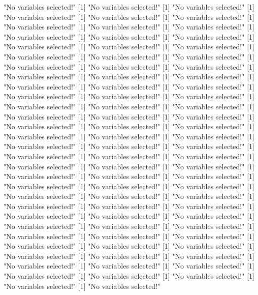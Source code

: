 \documentclass{amsart}
\begin{document}
\begin{Schunk}
\begin{Soutput}
[1] "No variables selected!"
[1] "No variables selected!"
[1] "No variables selected!"
[1] "No variables selected!"
[1] "No variables selected!"
[1] "No variables selected!"
[1] "No variables selected!"
[1] "No variables selected!"
[1] "No variables selected!"
[1] "No variables selected!"
[1] "No variables selected!"
[1] "No variables selected!"
[1] "No variables selected!"
[1] "No variables selected!"
[1] "No variables selected!"
[1] "No variables selected!"
[1] "No variables selected!"
[1] "No variables selected!"
[1] "No variables selected!"
[1] "No variables selected!"
[1] "No variables selected!"
[1] "No variables selected!"
[1] "No variables selected!"
[1] "No variables selected!"
[1] "No variables selected!"
[1] "No variables selected!"
[1] "No variables selected!"
[1] "No variables selected!"
[1] "No variables selected!"
[1] "No variables selected!"
[1] "No variables selected!"
[1] "No variables selected!"
[1] "No variables selected!"
[1] "No variables selected!"
[1] "No variables selected!"
[1] "No variables selected!"
[1] "No variables selected!"
[1] "No variables selected!"
[1] "No variables selected!"
[1] "No variables selected!"
[1] "No variables selected!"
[1] "No variables selected!"
[1] "No variables selected!"
[1] "No variables selected!"
[1] "No variables selected!"
[1] "No variables selected!"
[1] "No variables selected!"
[1] "No variables selected!"
[1] "No variables selected!"
[1] "No variables selected!"
[1] "No variables selected!"
[1] "No variables selected!"
[1] "No variables selected!"
[1] "No variables selected!"
[1] "No variables selected!"
[1] "No variables selected!"
[1] "No variables selected!"
[1] "No variables selected!"
[1] "No variables selected!"
[1] "No variables selected!"
[1] "No variables selected!"
[1] "No variables selected!"
[1] "No variables selected!"
[1] "No variables selected!"
[1] "No variables selected!"
[1] "No variables selected!"
[1] "No variables selected!"
[1] "No variables selected!"
[1] "No variables selected!"
[1] "No variables selected!"
[1] "No variables selected!"
[1] "No variables selected!"
[1] "No variables selected!"
[1] "No variables selected!"
[1] "No variables selected!"
[1] "No variables selected!"
[1] "No variables selected!"
[1] "No variables selected!"
[1] "No variables selected!"
[1] "No variables selected!"
[1] "No variables selected!"
[1] "No variables selected!"
[1] "No variables selected!"
[1] "No variables selected!"
[1] "No variables selected!"
[1] "No variables selected!"

\end{Soutput}
\end{Schunk}
\end{document}
